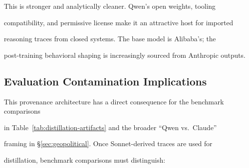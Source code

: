 This is stronger and analytically cleaner. Qwen's open weights, tooling





compatibility, and permissive license make it an attractive host for imported





reasoning traces from closed systems. The base model is Alibaba's; the





post-training behavioral shaping is increasingly sourced from Anthropic outputs.











\subsection{Evaluation Contamination Implications}











This provenance architecture has a direct consequence for the benchmark comparisons





in Table~\ref{tab:distillation-artifacts} and the broader ``Qwen vs.\ Claude''





framing in \S\ref{sec:geopolitical}. Once Sonnet-derived traces are used for





distillation, benchmark comparisons must distinguish:











